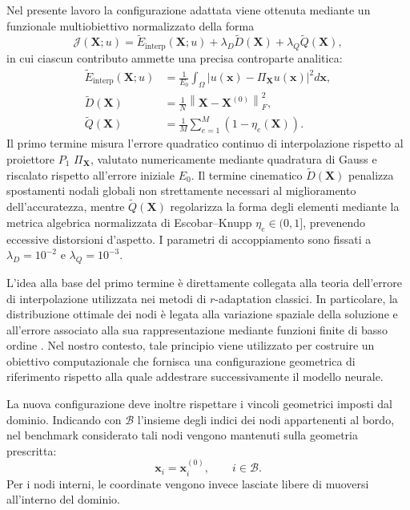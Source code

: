 Nel presente lavoro la configurazione adattata viene ottenuta mediante un funzionale multiobiettivo normalizzato della forma
\begin{equation}
\mathcal{J}(\mathbf{X};u)
=
\widetilde{E}_{\mathrm{interp}}(\mathbf{X};u)
+
\lambda_D
\widetilde{D}(\mathbf{X})
+
\lambda_Q
\widetilde{Q}(\mathbf{X}),
\label{eq:oracle_functional}
\end{equation}
in cui ciascun contributo ammette una precisa controparte analitica:
\begin{align}
\widetilde{E}_{\mathrm{interp}}(\mathbf{X};u)
&=
\frac{1}{E_0}
\int_\Omega
\left| u(\mathbf{x}) - \Pi_{\mathbf{X}} u(\mathbf{x}) \right|^2 d\mathbf{x},
\label{eq:oracle_e_interp}
\\
\widetilde{D}(\mathbf{X})
&=
\frac{1}{N}
\left\| \mathbf{X} - \mathbf{X}^{(0)} \right\|_F^2,
\label{eq:oracle_disp_penalty}
\\
\widetilde{Q}(\mathbf{X})
&=
\frac{1}{M}
\sum_{e=1}^{M}
\left( 1 - \eta_e(\mathbf{X}) \right).
\label{eq:oracle_quality_penalty}
\end{align}
Il primo termine misura l'errore quadratico continuo di interpolazione rispetto al proiettore $P_1$ $\Pi_{\mathbf{X}}$, valutato numericamente mediante quadratura di Gauss e riscalato rispetto all'errore iniziale $E_0$. Il termine cinematico $\widetilde{D}(\mathbf{X})$ penalizza spostamenti nodali globali non strettamente necessari al miglioramento dell'accuratezza, mentre $\widetilde{Q}(\mathbf{X})$ regolarizza la forma degli elementi mediante la metrica algebrica normalizzata di Escobar--Knupp $\eta_e \in (0, 1]$, prevenendo eccessive distorsioni d'aspetto. I parametri di accoppiamento sono fissati a $\lambda_D=10^{-2}$ e $\lambda_Q=10^{-3}$.

L'idea alla base del primo termine è direttamente collegata alla teoria dell'errore di interpolazione utilizzata nei metodi di $r$-adaptation classici. In particolare, la distribuzione ottimale dei nodi è legata alla variazione spaziale della soluzione e all'errore associato alla sua rappresentazione mediante funzioni finite di basso ordine \citep{cao2001comparison,huang2003variational}. Nel nostro contesto, tale principio viene utilizzato per costruire un obiettivo computazionale che fornisca una configurazione geometrica di riferimento rispetto alla quale addestrare successivamente il modello neurale.

La nuova configurazione deve inoltre rispettare i vincoli geometrici imposti dal dominio. Indicando con $\mathcal{B}$ l'insieme degli indici dei nodi appartenenti al bordo, nel benchmark considerato tali nodi vengono mantenuti sulla geometria prescritta:
\begin{equation}
\mathbf{x}_i=\mathbf{x}_i^{(0)},
\qquad
i\in\mathcal{B}.
\label{eq:boundary_mesh_constraint}
\end{equation}
Per i nodi interni, le coordinate vengono invece lasciate libere di muoversi all'interno del dominio.

